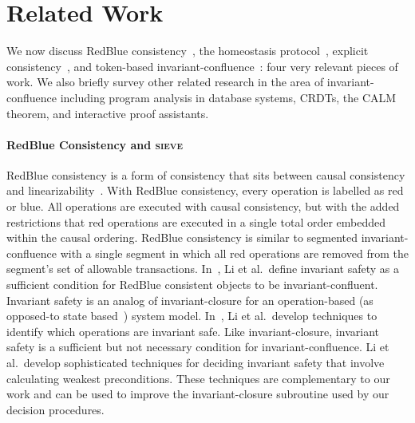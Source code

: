 \section{Related Work}
We now discuss RedBlue consistency~\cite{li2012making, li2014automating}, the
homeostasis protocol~\cite{roy2015homeostasis}, explicit
consistency~\cite{balegas2015putting}, and token-based
invariant-confluence~\cite{gotsman2016cause}: four very relevant pieces of
work. We also briefly survey other related research in the area of
invariant-confluence including program analysis in database systems, CRDTs, the
CALM theorem, and interactive proof assistants.

\newcommand{\sieve}{\textsc{sieve}}
\paragraph{RedBlue Consistency and \sieve}
RedBlue consistency is a form of consistency that sits between causal
consistency and linearizability~\cite{li2012making}. With RedBlue consistency,
every operation is labelled as red or blue. All operations are executed with
causal consistency, but with the added restrictions that red operations are
executed in a single total order embedded within the causal ordering.
RedBlue consistency is similar to segmented invariant-confluence with a single
segment in which all red operations are removed from the segment's set of
allowable transactions. In~\cite{li2012making}, Li et al.\ define
invariant safety as a sufficient condition for RedBlue consistent objects to be
invariant-confluent. Invariant safety is an analog of invariant-closure for an
operation-based (as opposed-to state based~\cite{shapiro2011conflict}) system
model. In~\cite{li2014automating}, Li et al.\ develop techniques to identify
which operations are invariant safe.  Like invariant-closure, invariant safety
is a sufficient but not necessary condition for invariant-confluence. Li et
al.\ develop sophisticated techniques for deciding invariant safety that
involve calculating weakest preconditions.  These techniques are complementary
to our work and can be used to improve the invariant-closure subroutine used by
our decision procedures.

